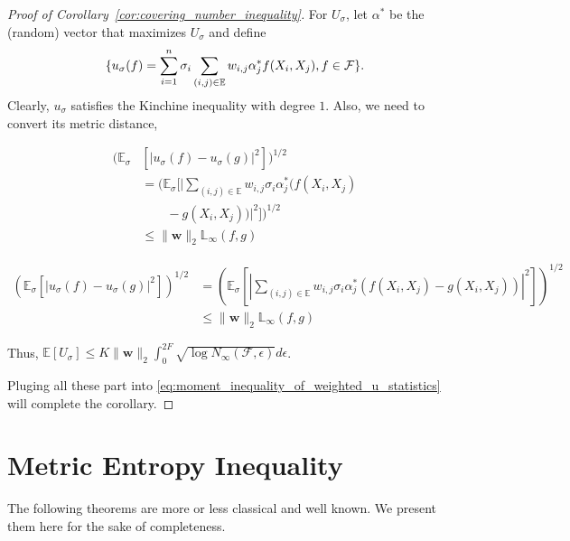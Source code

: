 \documentclass[letterpaper]{article} %
\def\DoubleColumn{}
\def\DoubleColumnEnd{}
\def\SingleColumn{}
\def\SingleColumnEnd{}
\newcommand{\E}{\mathbb{E}}
\newcommand{\weight}{\mathbf{w}}
\newcommand{\rademacher}{\sigma}
\newcommand{\pair}[1]{(#1)}
\newcommand{\lebesgue}{\mathbb{L}}
\begin{document}
\begin{proof}[Proof of Corollary~\ref{cor:covering_number_inequality}]
For $U_\rademacher$, let $\alpha^*$ be the (random) vector that maximizes $U_\rademacher$ and define
\[\{u_\rademacher(f) = \sum_{i=1}^n\rademacher_i\sum_{\pair{i,j}\in\E}w_{i,j}\alpha_j^*\linebreak f(X_i,X_j),f\in\mathcal{F}\}.\]
Clearly, $u_\rademacher$ satisfies the Kinchine inequality with degree $1$. Also, we need to convert its metric distance, 
\DoubleColumn
\begin{align*}
    (\E_\rademacher&[|u_\rademacher(f)-u_\rademacher(g)|^2])^{1/2}\\
    &=(\E_\rademacher[|\sum_{\pair{i,j}\in\E}w_{i,j}\rademacher_i\alpha_j^*(f(X_i,X_j)\\
    &\qquad-g(X_i,X_j))|^2])^{1/2}\\
    &\le \|\weight{}\|_2\lebesgue_\infty(f,g)
\end{align*}
\DoubleColumnEnd 
\SingleColumn
\begin{align*}
    (\E_\rademacher[|u_\rademacher(f)-u_\rademacher(g)|^2])^{1/2}&=(\E_\rademacher[|\sum_{\pair{i,j}\in\E}w_{i,j}\rademacher_i\alpha_j^*(f(X_i,X_j)-g(X_i,X_j))|^2])^{1/2}\\
    &\le \|\weight{}\|_2\lebesgue_\infty(f,g)
\end{align*}
\SingleColumnEnd
Thus, $\E[U_\rademacher]\le K\|\weight{}\|_2\int_0^{2F}\sqrt{\log N_\infty(\mathcal F,\epsilon)}d\epsilon$.

Pluging all these part into \eqref{eq:moment_inequality_of_weighted_u_statistics} will complete the corollary.
\end{proof}

\section{Metric Entropy Inequality} %
\label{sub:metric_entropy_inequality}

The following theorems are more or less classical and well known. We present them here for the sake of completeness.
\end{document}
